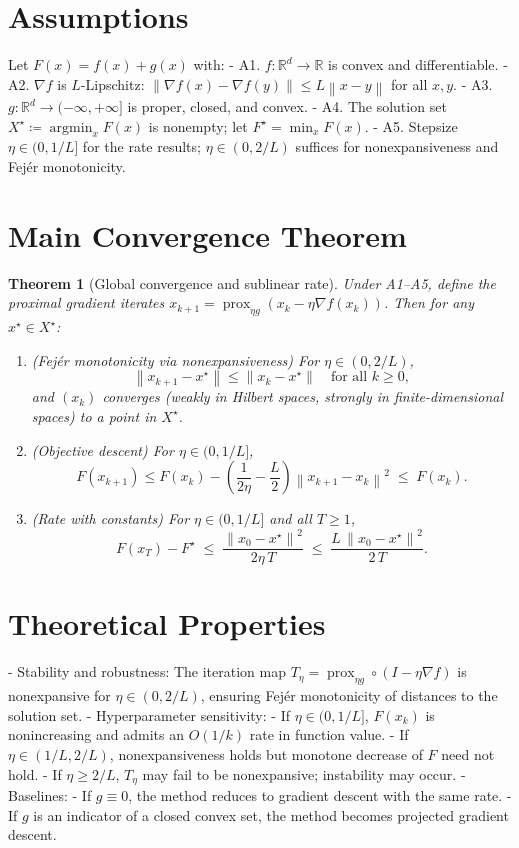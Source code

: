 \documentclass[11pt]{article}
\newtheorem{theorem}{Theorem}
\newcommand{\prox}{\operatorname{prox}}
\newcommand{\R}{\mathbb{R}}
\newcommand{\norm}[1]{\left\lVert #1 \right\rVert}
\begin{document}
\section*{Assumptions}
Let $F(x)=f(x)+g(x)$ with:
- A1. $f:\R^d\to\R$ is convex and differentiable.
- A2. $\nabla f$ is $L$-Lipschitz: $\norm{\nabla f(x)-\nabla f(y)}\le L\norm{x-y}$ for all $x,y$.
- A3. $g:\R^d\to(-\infty,+\infty]$ is proper, closed, and convex.
- A4. The solution set $X^\star\coloneqq\operatorname{argmin}_x F(x)$ is nonempty; let $F^\star=\min_x F(x)$.
- A5. Stepsize $\eta\in(0,1/L]$ for the rate results; $\eta\in(0,2/L)$ suffices for nonexpansiveness and Fej\'er monotonicity.

\section*{Main Convergence Theorem}
\begin{theorem}[Global convergence and sublinear rate]\label{thm:main}
Under A1--A5, define the proximal gradient iterates $x_{k+1} = \prox_{\eta g}(x_k - \eta \nabla f(x_k))$.
Then for any $x^\star\in X^\star$:
\begin{enumerate}
\item (Fej\'er monotonicity via nonexpansiveness) For $\eta\in(0,2/L)$,
\[
\norm{x_{k+1}-x^\star}\le \norm{x_k - x^\star}\quad\text{for all }k\ge 0,
\]
and $(x_k)$ converges (weakly in Hilbert spaces, strongly in finite-dimensional spaces) to a point in $X^\star$.
\item (Objective descent) For $\eta\in(0,1/L]$,
\[
F(x_{k+1})\le F(x_k) - \left(\frac{1}{2\eta}-\frac{L}{2}\right)\norm{x_{k+1}-x_k}^2 \;\le\; F(x_k).
\]
\item (Rate with constants) For $\eta\in(0,1/L]$ and all $T\ge 1$,
\[
F(x_T)-F^\star \;\le\; \frac{\norm{x_0-x^\star}^2}{2\eta\,T} \;\le\; \frac{L\,\norm{x_0-x^\star}^2}{2\,T}.
\]
\end{enumerate}
\end{theorem}

\section*{Theoretical Properties}
- Stability and robustness: The iteration map $T_\eta=\prox_{\eta g}\circ (I-\eta\nabla f)$ is nonexpansive for $\eta\in(0,2/L)$, ensuring Fej\'er monotonicity of distances to the solution set.
- Hyperparameter sensitivity: 
  - If $\eta\in(0,1/L]$, $F(x_k)$ is nonincreasing and admits an $O(1/k)$ rate in function value.
  - If $\eta\in(1/L,2/L)$, nonexpansiveness holds but monotone decrease of $F$ need not hold.
  - If $\eta\ge 2/L$, $T_\eta$ may fail to be nonexpansive; instability may occur.
- Baselines:
  - If $g\equiv 0$, the method reduces to gradient descent with the same rate.
  - If $g$ is an indicator of a closed convex set, the method becomes projected gradient descent.
\end{document}
